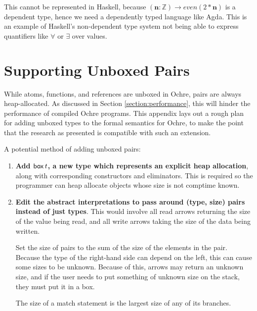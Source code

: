 \documentclass[12pt,twoside]{report}
\begin{document}
This cannot be represented in Haskell, because $(\textbf{n}: \mathbb{Z}) \rightarrow even(2 * \textbf{n})$ is a dependent type, hence we need a dependently typed language like Agda. This is an example of Haskell's non-dependent type system not being able to express quantifiers like $\forall$ or $\exists$ over values.



\section{Supporting Unboxed Pairs}
\label{appendix:unbox}
While atoms, functions, and references are unboxed in Ochre, pairs are always heap-allocated. As discussed in Section \ref{section:performance}, this will hinder the performance of compiled Ochre programs. This appendix lays out a rough plan for adding unboxed types to the formal semantics for Ochre, to make the point that the research as presented is compatible with such an extension.

A potential method of adding unboxed pairs:

\begin{enumerate}
  \item \textbf{Add $\mathsf{box} \, t$, a new type which represents an explicit heap allocation}, along with corresponding constructors and eliminators. This is required so the programmer can heap allocate objects whose size is not comptime known.
  \item \textbf{Edit the abstract interpretations to pass around (type, size) pairs instead of just types}. This would involve all read arrows returning the size of the value being read, and all write arrows taking the size of the data being written.
  
  Set the size of pairs to the sum of the size of the elements in the pair. Because the type of the right-hand side can depend on the left, this can cause some sizes to be unknown. Because of this, arrows may return an unknown size, and if the user needs to put something of unknown size on the stack, they must put it in a box.

  The size of a match statement is the largest size of any of its branches.
\end{enumerate}
\end{document}
